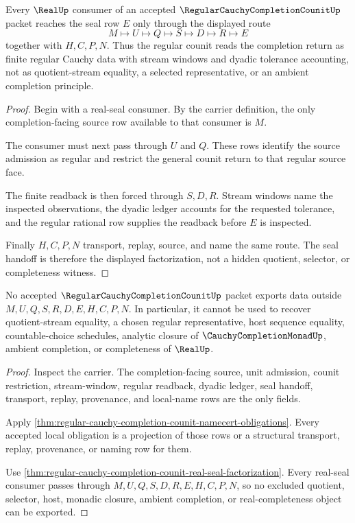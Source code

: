 \begin{theorem}
\label{thm:regular-cauchy-completion-counit-real-seal-factorization}
Every $\RealUp$ consumer of an accepted $\RegularCauchyCompletionCounitUp$ packet reaches the seal row $E$ only through the displayed route
$$
M\longmapsto U\longmapsto Q\longmapsto S\longmapsto D\longmapsto R\longmapsto E
$$
together with $H,C,P,N$. Thus the regular counit reads the completion return as finite regular Cauchy data with stream windows and dyadic tolerance accounting, not as quotient-stream equality, a selected representative, or an ambient completion principle.
\end{theorem}
\begin{proof}
Begin with a real-seal consumer. By the carrier definition, the only completion-facing source row available to that consumer is $M$.

The consumer must next pass through $U$ and $Q$. These rows identify the source admission as regular and restrict the general counit return to that regular source face.

The finite readback is then forced through $S,D,R$. Stream windows name the inspected observations, the dyadic ledger accounts for the requested tolerance, and the regular rational row supplies the readback before $E$ is inspected.

Finally $H,C,P,N$ transport, replay, source, and name the same route. The seal handoff is therefore the displayed factorization, not a hidden quotient, selector, or completeness witness.
\end{proof}

\begin{theorem}
\label{thm:regular-cauchy-completion-counit-nonescape}
No accepted $\RegularCauchyCompletionCounitUp$ packet exports data outside $M,U,Q,S,R,D,E,H,C,P,N$. In particular, it cannot be used to recover quotient-stream equality, a chosen regular representative, host sequence equality, countable-choice schedules, analytic closure of $\CauchyCompletionMonadUp$, ambient completion, or completeness of $\RealUp$.
\end{theorem}
\begin{proof}
Inspect the carrier. The completion-facing source, unit admission, counit restriction, stream-window, regular readback, dyadic ledger, seal handoff, transport, replay, provenance, and local-name rows are the only fields.

Apply \autoref{thm:regular-cauchy-completion-counit-namecert-obligations}. Every accepted local obligation is a projection of those rows or a structural transport, replay, provenance, or naming row for them.

Use \autoref{thm:regular-cauchy-completion-counit-real-seal-factorization}. Every real-seal consumer passes through $M,U,Q,S,D,R,E,H,C,P,N$, so no excluded quotient, selector, host, monadic closure, ambient completion, or real-completeness object can be exported.
\end{proof}

